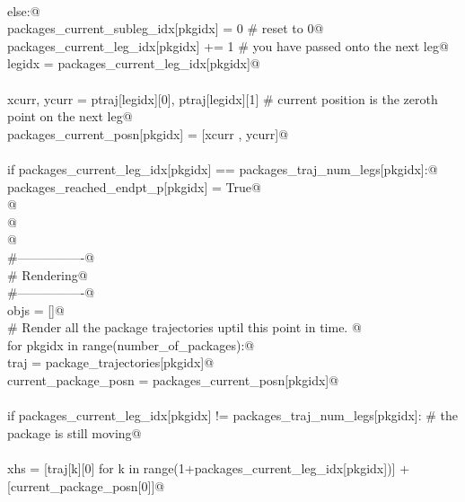 \documentclass[10.0pt]{report}
\begin{document}
\begin{appendices}
\begin{flushleft}
\begin{list}{}{}
\mbox{}\verb@@\\
\mbox{}\verb@                  else:@\\
\mbox{}\verb@                    packages_current_subleg_idx[pkgidx] = 0 # reset to 0@\\
\mbox{}\verb@                    packages_current_leg_idx[pkgidx]   += 1 # you have passed onto the next leg@\\
\mbox{}\verb@                    legidx    = packages_current_leg_idx[pkgidx]@\\
\mbox{}\verb@@\\
\mbox{}\verb@                    xcurr, ycurr = ptraj[legidx][0], ptraj[legidx][1] # current position is the zeroth point on the next leg@\\
\mbox{}\verb@                    packages_current_posn[pkgidx]  = [xcurr , ycurr]@\\
\mbox{}\verb@@\\
\mbox{}\verb@                    if packages_current_leg_idx[pkgidx] == packages_traj_num_legs[pkgidx]:@\\
\mbox{}\verb@                        packages_reached_endpt_p[pkgidx] = True@\\
\mbox{}\verb@ @\\
\mbox{}\verb@            @\\
\mbox{}\verb@         @\\
\mbox{}\verb@        #----------------@\\
\mbox{}\verb@        # Rendering@\\
\mbox{}\verb@        #----------------@\\
\mbox{}\verb@        objs = []@\\
\mbox{}\verb@        # Render all the package trajectories uptil this point in time.  @\\
\mbox{}\verb@        for pkgidx in range(number_of_packages):@\\
\mbox{}\verb@            traj                 = package_trajectories[pkgidx]@\\
\mbox{}\verb@            current_package_posn = packages_current_posn[pkgidx]@\\
\mbox{}\verb@@\\
\mbox{}\verb@            if packages_current_leg_idx[pkgidx] != packages_traj_num_legs[pkgidx]: # the package is still moving@\\
\mbox{}\verb@@\\
\mbox{}\verb@                  xhs = [traj[k][0] for k in range(1+packages_current_leg_idx[pkgidx])] + [current_package_posn[0]]@\\

\end{list}
\end{flushleft}
\end{appendices}
\end{document}
